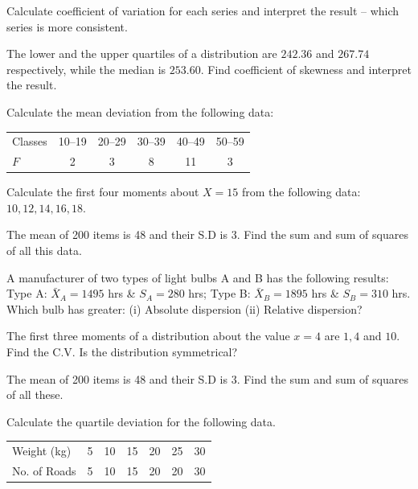 \documentclass[11pt,a4paper]{article}
\begin{document}
\begin{longlist}
\item Calculate coefficient of variation for each series and interpret the result -- which series is more consistent.

\item The lower and the upper quartiles of a distribution are $242.36$ and $267.74$ respectively, while the median is $253.60$. Find coefficient of skewness and interpret the result.

\item Calculate the mean deviation from the following data:
\begin{center}
\begin{tabular}{l|ccccc}
Classes & 10--19 & 20--29 & 30--39 & 40--49 & 50--59 \\
$F$ & 2 & 3 & 8 & 11 & 3
\end{tabular}
\end{center}

\item Calculate the first four moments about $X=15$ from the following data: $10,12,14,16,18$.

\item The mean of 200 items is 48 and their S.D is 3. Find the sum and sum of squares of all this data.

\item A manufacturer of two types of light bulbs A and B has the following results: Type A: $\bar{X}_A=1495$ hrs \& $S_A=280$ hrs; Type B: $\bar{X}_B=1895$ hrs \& $S_B=310$ hrs. Which bulb has greater: (i) Absolute dispersion (ii) Relative dispersion?

\item The first three moments of a distribution about the value $x=4$ are $1,4$ and $10$. Find the C.V. Is the distribution symmetrical?

\item The mean of 200 items is 48 and their S.D is 3. Find the sum and sum of squares of all these.

\item Calculate the quartile deviation for the following data.
\begin{center}
\begin{tabular}{l cccccc}
\toprule
Weight (kg) & 5 & 10 & 15 & 20 & 25 & 30 \\
No. of Roads & 5 & 10 & 15 & 20 & 20 & 30 \\
\bottomrule
\end{tabular}
\end{center}


\end{longlist}
\end{document}
